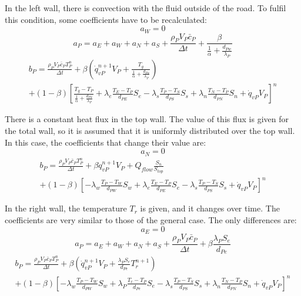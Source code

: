 In the left wall, there is convection with the fluid outside of the road. To fulfil this condition, some coefficients have to be recalculated:
\begin{equation}
a_{W}=0
\end{equation}
\begin{equation}
a_{P}=a_{E}+a_{W}+a_{N}+a_{S}+\frac{\rho_{P}V_{P}\bar{c}_{P}}{\Delta t}+\frac{\beta}{\frac{1}{\alpha}+\frac{d_{Pw}}{\lambda_{P}}}
\end{equation}
\begin{multline}
b_{P}=\frac{\rho_{P}V_{P}\bar{c}_{P}T_{P}^{n}}{\Delta t}+\beta\left(\dot{q}_{vP}^{n+1}V_{P}+\frac{T_{g}}{\frac{1}{\alpha}+\frac{d_{Pw}}{\lambda_{P}}}\right) \\
+\left(1-\beta\right)\left[\frac{T_{g}-T_{P}}{\frac{1}{\alpha}+\frac{d_{Pw}}{\lambda_{P}}}+\lambda_{e}\frac{T_{E}-T_{P}}{d_{PE}}S_{e}-\lambda_{s}\frac{T_{P}-T_{S}}{d_{PS}}S_{s}+\lambda_{n}\frac{T_{N}-T_{P}}{d_{PN}}S_{n}+\dot{q}_{vP}V_{P}\right]^{n}
\end{multline}

There is a constant heat flux in the top wall. The value of this flux is given for the total wall, so it is assumed that it is uniformly distributed over the top wall. In this case, the coefficients that change their value are:
\begin{equation}
a_{N}=0
\end{equation}
\begin{multline}
b_{P}=\frac{\rho_{P}V_{P}\bar{c}_{P}T_{P}^{n}}{\Delta t}+\beta\dot{q}_{vP}^{n+1}V_{P}+Q_{flow}\frac{S_{n}}{S_{top}} \\
+\left(1-\beta\right)\left[-\lambda_{w}\frac{T_{P}-T_{W}}{d_{PW}}S_{w}+\lambda_{e}\frac{T_{E}-T_{P}}{d_{PE}}S_{e}-\lambda_{s}\frac{T_{P}-T_{S}}{d_{PS}}S_{s}+\dot{q}_{vP}V_{P}\right]^{n}
\end{multline}

In the right wall, the temperature $T_{r}$ is given, and it changes over time. The coefficients are very similar to those of the general case. The only differences are:
\begin{equation}
a_{E}=0
\end{equation}
\begin{equation}
a_P=a_{E}+a_{W}+a_{N}+a_{S}+\frac{\rho_{P}V_{P}\bar{c}_{P}}{\Delta t}+\beta\frac{\lambda_{P}S_{e}}{d_{Pe}}
\end{equation}
\begin{multline}
b_{P}=\frac{\rho_{P}V_{P}\bar{c}_{P}T_{P}^{n}}{\Delta t}+\beta\left(\dot{q}_{vP}^{n+1}V_{P}+\frac{\lambda_{P}S_{e}}{d_{Pe}}T_{r}^{n+1}\right) \\
+\left(1-\beta\right)\left[-\lambda_{w}\frac{T_{P}-T_{W}}{d_{PW}}S_{w}+\lambda_{P}\frac{T_{r}-T_{P}}{d_{Pe}}S_{e}-\lambda_{s}\frac{T_{P}-T_{S}}{d_{PS}}S_{s}+\lambda_{n}\frac{T_{N}-T_{P}}{d_{PN}}S_{n}+\dot{q}_{vP}V_{P}\right]^{n}
\end{multline}

